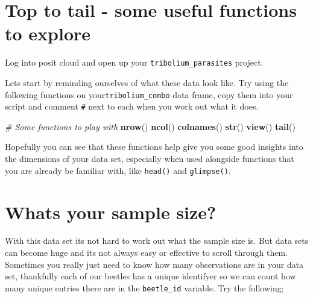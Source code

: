 \documentclass[
]{book}
\newenvironment{Shaded}{\begin{snugshade}}{\end{snugshade}}
\newcommand{\CommentTok}[1]{\textcolor[rgb]{0.56,0.35,0.01}{\textit{#1}}}
\newcommand{\FunctionTok}[1]{\textcolor[rgb]{0.13,0.29,0.53}{\textbf{#1}}}
\newcommand{\NormalTok}[1]{#1}
\newcommand{\SpecialCharTok}[1]{\textcolor[rgb]{0.81,0.36,0.00}{\textbf{#1}}}
\begin{document}
\section{Top to tail - some useful functions to explore}\label{top-to-tail---some-useful-functions-to-explore}

Log into posit cloud and open up your \texttt{tribolium\_parasites} project.

Lets start by reminding ourselves of what these data look like. Try using the following functions on your\texttt{tribolium\_combo} data frame, copy them into your script and comment \texttt{\#} next to each when you work out what it does.

\begin{Shaded}
\begin{Highlighting}[]
\CommentTok{\# Some functions to play with}
\FunctionTok{nrow}\NormalTok{()}
\FunctionTok{ncol}\NormalTok{()}
\FunctionTok{colnames}\NormalTok{()}
\FunctionTok{str}\NormalTok{()}
\FunctionTok{view}\NormalTok{()}
\FunctionTok{tail}\NormalTok{()}
\end{Highlighting}
\end{Shaded}

Hopefully you can see that these functions help give you some good insights into the dimensions of your data set, especially when used alongside functions that you are already be familiar with, like \texttt{head()} and \texttt{glimpse()}.

\section{Whats your sample size?}\label{whats-your-sample-size}

With this data set its not hard to work out what the sample size is. But data sets can become huge and its not always easy or effective to scroll through them. Sometimes you really just need to know how many observations are in your data set, thankfully each of our beetles has a unique identifyer so we can count how many unique entries there are in the \texttt{beetle\_id} variable. Try the following;

\begin{Shaded}
\end{Shaded}
\end{document}
